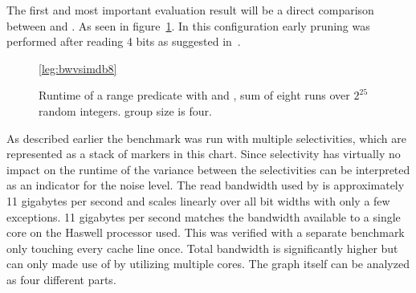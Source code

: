 The first and most important evaluation result will be a direct comparison
between \simdscan{} and \bwv{}. As seen in figure~\ref{fig:eval:bwvsimdb8}. In
this configuration early pruning was performed after reading 4 bits as
suggested in~\cite{BitWeaving}.

\begin{figure}[h]
\pgfplotsset{footnotesize,width=0.75*\textwidth,height=6cm,compat=1.8}
\begin{center}

\ref*{leg:bwvsimdb8}
\end{center}
\caption{Runtime of a range predicate with \simdscan{} and \bwv{}, sum of eight
runs over $2^{25}$ random integers. \bwv{} group size is four.}
\label{fig:eval:bwvsimdb8}
\end{figure}

As described earlier the benchmark was run with multiple selectivities, which
are represented as a stack of markers in this chart. Since selectivity has
virtually no impact on the runtime of \simdscan{} the variance between the
selectivities can be interpreted as an indicator for the noise level. The read
bandwidth used by \simdscan{} is approximately 11 gigabytes per second and
scales linearly over all bit widths with only a few exceptions. 11 gigabytes
per second matches the bandwidth available to a single core on the Haswell
processor used. This was verified with a separate benchmark only touching every
cache line once. Total bandwidth is significantly higher but can only made use
of by utilizing multiple cores. The graph itself can be analyzed as four
different parts.

